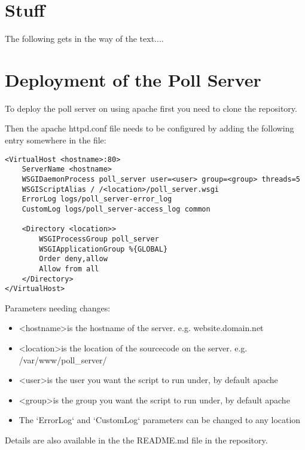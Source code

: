 \chapter{Stuff} \label{Chapter:Stuff}
The following gets in the way of the text....

\chapter{Deployment of the Poll Server} \label{Chapter:Deployment Poll Server}

To deploy the poll server on using apache first you need to clone the repository.

Then the apache httpd.conf file needs to be configured by adding the following entry somewhere in the file:

\begin{lstlisting}
<VirtualHost <hostname>:80>
	ServerName <hostname>
	WSGIDaemonProcess poll_server user=<user> group=<group> threads=5
	WSGIScriptAlias / /<location>/poll_server.wsgi
	ErrorLog logs/poll_server-error_log
	CustomLog logs/poll_server-access_log common

	<Directory <location>>
		WSGIProcessGroup poll_server
		WSGIApplicationGroup %{GLOBAL}
		Order deny,allow
		Allow from all
	</Directory>
</VirtualHost>
\end{lstlisting}

Parameters needing changes:

\begin{itemize}
\item \textless hostname\textgreater is the hostname of the server. e.g. website.domain.net
\item \textless location\textgreater is the location of the sourcecode on the server. e.g. /var/www/poll\_server/
\item \textless user\textgreater is the user you want the script to run under, by default apache
\item \textless group\textgreater is the group you want the script to run under, by default apache
\item The `ErrorLog` and `CustomLog` parameters can be changed to any location

\end{itemize}



Details are also available in the the README.md file in the repository.
